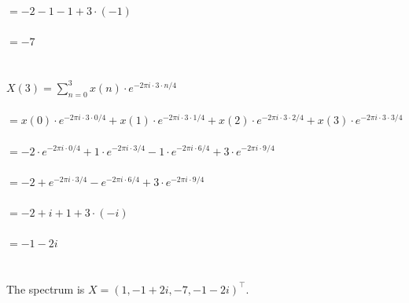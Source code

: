 \documentclass[12pt]{article}
\begin{document}
$= -2 - 1 - 1 + 3 \cdot (-1)$\\\\
$= -7$\\\\\\
$X(3) = \sum_{n=0}^{3} x(n) \cdot e^{-2\pi i \cdot 3 \cdot n/4}$\\\\
$= x(0) \cdot e^{-2\pi i \cdot 3 \cdot 0/4} + x(1) \cdot e^{-2\pi i \cdot 3 \cdot 1/4} + x(2) \cdot e^{-2\pi i \cdot 3 \cdot 2/4} + x(3) \cdot e^{-2\pi i \cdot 3 \cdot 3/4}$\\\\
$= -2 \cdot e^{-2\pi i \cdot 0/4} + 1 \cdot e^{-2\pi i \cdot 3/4} - 1 \cdot e^{-2\pi i \cdot 6/4} + 3 \cdot e^{-2\pi i \cdot 9/4}$\\\\
$= -2 + e^{-2\pi i \cdot 3/4} - e^{-2\pi i \cdot 6/4} + 3 \cdot e^{-2\pi i \cdot 9/4}$\\\\
$= -2 + i + 1 + 3 \cdot (-i)$\\\\
$= -1 - 2i$\\\\\\
The spectrum is $X=(1, -1+2i, -7, -1-2i)^\top$.
\end{document}
